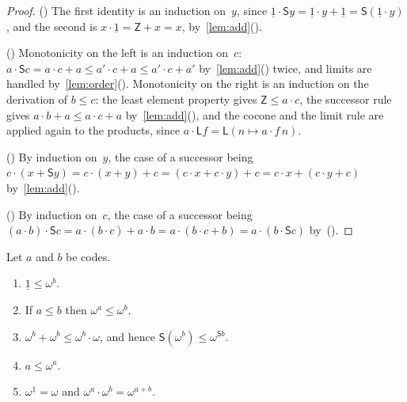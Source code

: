 \documentclass[11pt]{amsart}
\makeatletter
\newcommand{\bZ}{\mathsf{Z}}
\newcommand{\bS}{\mathsf{S}}
\newcommand{\bL}{\mathsf{L}}
\newcommand{\bplus}{\mathbin{+}}
\newcommand{\btimes}{\mathbin{\cdot}}
\newcommand{\num}[1]{\underline{#1}}          %
\newif\ifagdarefs
\newcommand{\AgdaRefs}[1]{\ifagdarefs{\footnotesize\color{agdablue}(#1)}\else\unskip\fi}
\newcommand{\Agda}[2]{{\footnotesize\color{agdablue}\textsf{#1}%
  \ifblank{#2}{}{\texttt{.}\allowbreak\texttt{#2}}}}
\let\ttt@plain\texttt
\renewcommand{\texttt}[1]{{\footnotesize\color{agdablue}\ttt@plain{#1}}}
\theoremstyle{plain}
\theoremstyle{definition}
\makeatother
\begin{document}
\begin{proof}
() The first identity is an induction on~$y$,
since $\num 1 \btimes \bS y = \num 1 \btimes y \bplus \num 1
= \bS(\num 1 \btimes y)$, and the second is
$x \btimes \num 1 = \bZ \bplus x = x$, by~\cref{lem:add}().

() Monotonicity on the left is an induction
on~$c$: $a \btimes \bS c = a \btimes c \bplus a \le a' \btimes c \bplus
a \le a' \btimes c \bplus a'$ by~\cref{lem:add}()
twice, and limits are handled
by~\cref{lem:order}(). Monotonicity on the right
is an induction on the derivation of $b \le c$: the least element
property gives $\bZ \le a \btimes c$, the successor rule gives
$a \btimes b \bplus a \le a \btimes c \bplus a$
by~\cref{lem:add}(), and the cocone and the
limit rule are applied again to the products, since
$a \btimes \bL f = \bL(n \mapsto a \btimes f\,n)$.

() By induction on~$y$, the case of a successor
being
$c \btimes (x \bplus \bS y) = c \btimes (x \bplus y) \bplus c
= (c \btimes x \bplus c \btimes y) \bplus c
= c \btimes x \bplus (c \btimes y \bplus c)$
by~\cref{lem:add}().

() By induction on~$c$, the case of a
successor being
$(a \btimes b) \btimes \bS c = a \btimes (b \btimes c) \bplus a \btimes b
= a \btimes (b \btimes c \bplus b) = a \btimes (b \btimes \bS c)$
by~().
\end{proof}

\begin{lemma}[Exponentiation]
\label{lem:exp}
Let $a$ and $b$ be codes.
\begin{enumerate}
\item\label{item:exp-pos}
  $\num 1 \le \omega^{b}$.
\item\label{item:exp-mono}
  If $a \le b$ then $\omega^{a} \le \omega^{b}$.
\item\label{item:exp-double}
  $\omega^{b} \bplus \omega^{b} \le \omega^{b} \btimes \omega$, and
  hence $\bS(\omega^{b}) \le \omega^{\bS b}$.
\item\label{item:exp-incr}
  $a \le \omega^{a}$.
\item\label{item:exp-hom}
  $\omega^{\num 1} = \omega$ and
  $\omega^{a} \btimes \omega^{b} = \omega^{a \bplus b}$.
\end{enumerate}
\AgdaRefs{\Agda{BrouwerOrdinals.Epsilon0}{one-≤-ω\^{}};
\texttt{ω\^{}-mono}, \texttt{ω\^{}-double}, \texttt{S-ω\^{}-step},
\texttt{≤-ω\^{}}, \texttt{ω\^{}-ι1};
\Agda{BrouwerOrdinals.MultClosure}{ω\^{}⊗}.}
\end{lemma}
\end{document}

